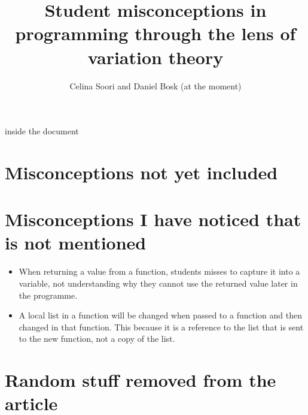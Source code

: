 \documentclass[onecolumn]{article}
\title{Student misconceptions in programming through the lens of variation 
theory}
\author{Celina Soori and Daniel Bosk (at the moment)}
\begin{document}
inside the document

\maketitle
\newpage
\tableofcontents
\newpage






















\newpage
\printbibliography

\newpage

\appendix

\section{Misconceptions not yet included}




\section{Misconceptions I have noticed that is not mentioned}

\begin{itemize}
    \item When returning a value from a function, students misses to 
capture it into a variable, not understanding why they cannot use the 
returned value later in the programme. 
    \item A local list in a function will be changed when passed to a 
function and then changed in that function. This because it is a 
reference to the list that is sent to the new function, not a copy of 
the list. 
\end{itemize}

\section{Random stuff removed from the article}
\end{document}
